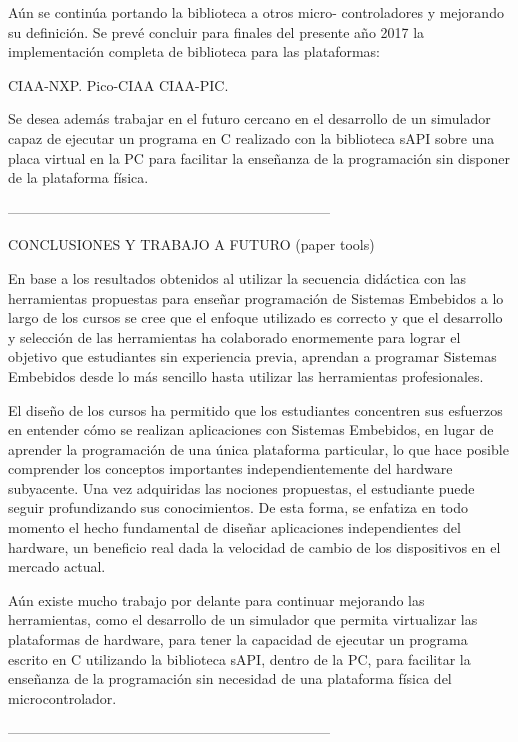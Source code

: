 Aún se continúa portando la biblioteca a otros micro- controladores y mejorando su definición. Se prevé concluir para finales del presente año 2017 la implementación completa de biblioteca para las plataformas:

CIAA-NXP.
Pico-CIAA
CIAA-PIC.

Se desea además trabajar en el futuro cercano en el desarrollo de un simulador capaz de ejecutar un programa en C realizado con la biblioteca sAPI sobre una placa virtual en la PC para facilitar la enseñanza de la programación sin disponer de la plataforma física.


---------------------------------------------------------------------

CONCLUSIONES Y TRABAJO A FUTURO (paper tools)


En base a los resultados obtenidos al utilizar la secuencia
didáctica con las herramientas propuestas para enseñar
programación de Sistemas Embebidos a lo largo de los cursos
se cree que el enfoque utilizado es correcto y que el desarrollo
y selección de las herramientas ha colaborado enormemente
para lograr el objetivo que estudiantes sin experiencia previa,
aprendan a programar Sistemas Embebidos desde lo más
sencillo hasta utilizar las herramientas profesionales.

El diseño de los cursos ha permitido que los estudiantes
concentren sus esfuerzos en entender cómo se realizan
aplicaciones con Sistemas Embebidos, en lugar de aprender la
programación de una única plataforma particular, lo que hace
posible comprender los conceptos importantes
independientemente del hardware subyacente. Una vez
adquiridas las nociones propuestas, el estudiante puede seguir
profundizando sus conocimientos. De esta forma, se enfatiza
en todo momento el hecho fundamental de diseñar
aplicaciones independientes del hardware, un beneficio real
dada la velocidad de cambio de los dispositivos en el mercado
actual.

Aún existe mucho trabajo por delante para continuar
mejorando las herramientas, como el desarrollo de un
simulador que permita virtualizar las plataformas de hardware,
para tener la capacidad de ejecutar un programa escrito en C
utilizando la biblioteca sAPI, dentro de la PC, para facilitar la
enseñanza de la programación sin necesidad de una plataforma
física del microcontrolador.

---------------------------------------------------------------------

